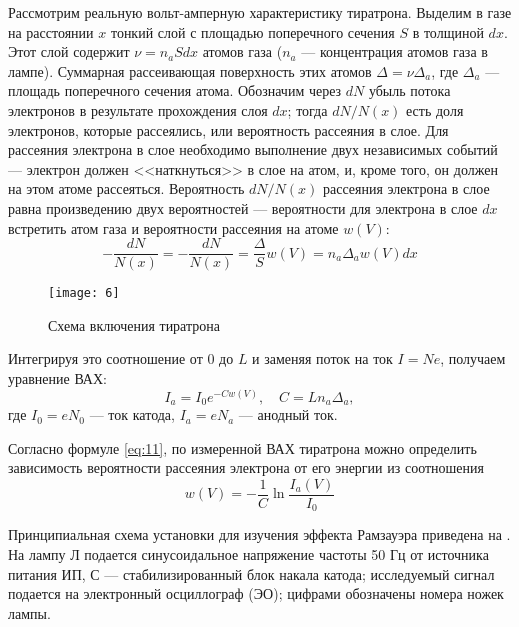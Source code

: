 \documentclass[a4paper, 12pt]{article}
\begin{document}
Рассмотрим реальную вольт-амперную характеристику тиратрона. Выделим в
газе на расстоянии $x$ тонкий слой с площадью поперечного сечения $S$
в толщиной $dx$. Этот слой содержит $\nu = n_a S dx$ атомов газа
($n_a$ --- концентрация атомов газа в лампе). Суммарная рассеивающая
поверхность этих атомов $\Delta = \nu \Delta_a$, где $\Delta_a$ ---
площадь поперечного сечения атома. Обозначим через $dN$ убыль потока
электронов в результате прохождения слоя $dx$; тогда $dN/N(x)$ есть
доля электронов, которые рассеялись, или вероятность рассеяния в слое.
Для рассеяния электрона в слое необходимо выполнение двух независимых
событий --- электрон должен <<наткнуться>> в слое на атом, и, кроме
того,  он должен на этом атоме рассеяться. Вероятность $dN/N(x)$
рассеяния электрона в слое равна произведению двух вероятностей ---
вероятности для электрона в слое $dx$ встретить атом газа и
вероятности рассеяния на атоме $w(V)$:
\begin{equation}
    - \frac{dN}{N(x)} = -\frac{d N}{N(x)} = \frac{\Delta}{S}w(V) = n_a
    \Delta_a w (V)dx
    \label{eq:12}
\end{equation}

\begin{wrapfigure}[10]{l}{0.4\linewidth}
\vspace{-1em}
    \texttt{[image: 6]}
    \caption{Схема включения тиратрона}
    \label{fig:6}
\end{wrapfigure}

Интегрируя это соотношение от $0$ до $L$ и заменяя поток на ток
$I=Ne$, получаем уравнение ВАХ:
\begin{equation}
    I_a = I_0 e ^{-C w (V)}, \hspace{1em} C = L n_a \Delta_a,
    \label{eq:13}
\end{equation}
где $I_0 = e N_0$ --- ток катода, $I_a = e N_a$ --- анодный ток.

Согласно формуле \eqref{eq:11}, по измеренной ВАХ тиратрона можно
определить зависимость вероятности рассеяния электрона от его энергии
из соотношения
\begin{equation}
    w (V) = -\frac{1}{C} \ln \frac{I_a (V)}{I_0}
    \label{eq:14}
\end{equation}


Принципиальная схема установки для изучения эффекта Рамзауэра
приведена на . На лампу Л подается синусоидальное
напряжение частоты 50 Гц от источника питания ИП, С ---
стабилизированный блок накала катода; исследуемый сигнал подается на
электронный осциллограф (ЭО); цифрами обозначены номера ножек лампы.
\end{document}
